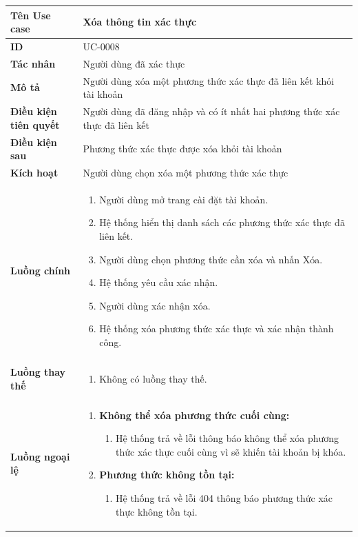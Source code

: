 {
\small
\renewcommand{\arraystretch}{1.15}

\begin{tabularx}{\textwidth}{|>{\raggedright\arraybackslash}p{3.5cm}|>{\raggedright\arraybackslash}X|}
\hline
\textbf{Tên Use case} & Xóa thông tin xác thực \\
\hline
\textbf{ID} & UC-0008 \\
\hline
\textbf{Tác nhân} & Người dùng đã xác thực \\
\hline
\textbf{Mô tả} & Người dùng xóa một phương thức xác thực đã liên kết khỏi tài khoản \\
\hline
\textbf{Điều kiện tiên quyết} & Người dùng đã đăng nhập và có ít nhất hai phương thức xác thực đã liên kết \\
\hline
\textbf{Điều kiện sau} & Phương thức xác thực được xóa khỏi tài khoản \\
\hline
\textbf{Kích hoạt} & Người dùng chọn xóa một phương thức xác thực \\
\hline
\textbf{Luồng chính} &
\begin{enumerate}
    \item Người dùng mở trang cài đặt tài khoản.
    \item Hệ thống hiển thị danh sách các phương thức xác thực đã liên kết.
    \item Người dùng chọn phương thức cần xóa và nhấn Xóa.
    \item Hệ thống yêu cầu xác nhận.
    \item Người dùng xác nhận xóa.
    \item Hệ thống xóa phương thức xác thực và xác nhận thành công.
\end{enumerate} \\
\hline
\textbf{Luồng thay thế} &
\begin{enumerate}
    \item Không có luồng thay thế.
\end{enumerate} \\
\hline
\textbf{Luồng ngoại lệ} &
\begin{enumerate}
    \item \textbf{Không thể xóa phương thức cuối cùng:}
    \begin{enumerate}
        \item[6Err.] Hệ thống trả về lỗi thông báo không thể xóa phương thức xác thực cuối cùng vì sẽ khiến tài khoản bị khóa.
    \end{enumerate}
    \item \textbf{Phương thức không tồn tại:}
    \begin{enumerate}
        \item[3Err.] Hệ thống trả về lỗi 404 thông báo phương thức xác thực không tồn tại.
    \end{enumerate}
\end{enumerate} \\
\hline
\end{tabularx}
}
